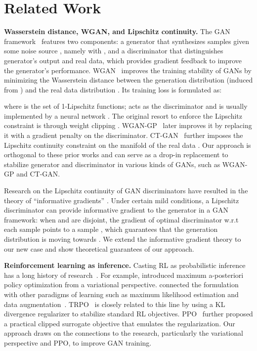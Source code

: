 \documentclass{article}
\newcommand{\0}{\bm{0}}
\begin{document}
\section{Related Work}\label{sec:related}


\textbf{Wasserstein distance, WGAN, and Lipschitz continuity.} 
The GAN framework~\cite{goodfellow2014generative} features two components: a generator  that synthesizes samples  given some noise source , namely  with , and a discriminator that distinguishes generator’s output and real data, which provides gradient feedback to improve the generator's performance. WGAN~\cite{WGAN} improves the training stability of GANs by minimizing the Wasserstein distance  between the generation distribution  (induced from ) and the real data distribution .
Its training loss is formulated as:

where  is the set of 1-Lipschitz functions;  acts as the discriminator and is usually implemented by a neural network .
The original resort to enforce the Lipschitz constraint is through weight clipping \cite{WGAN}. WGAN-GP~\cite{wgangp} later improves it by  replacing it with a gradient penalty on the discriminator. CT-GAN~\cite{wwgan} further imposes the Lipschitz continuity constraint on  the manifold of the real data . Our approach is orthogonal to these prior works and can serve as a drop-in replacement to stabilize generator and discriminator in various kinds of GANs, such as WGAN-GP and CT-GAN.






Research on the Lipschitz continuity of GAN discriminators have resulted in the theory of ``informative gradients'' \cite{lipschitz,zhou2018understanding}. Under certain mild conditions, a Lipschitz discriminator can provide informative gradient to the generator in a GAN framework: when  and  are disjoint, the gradient  of optimal discriminator  w.r.t each sample  points to a sample , which guarantees that the generation distribution  is moving towards . We extend the informative gradient theory to our new case and show theoretical guarantees of our approach.




\textbf{Reinforcement learning as inference.} 
Casting RL as probabilistic inference has a long history of research~\cite{dayan1997using,deisenroth2013survey,rawlik2013stochastic,levine2018reinforcement,abdolmaleki2018maximum}. 
For example, \citet{abdolmaleki2018maximum} introduced maximum a-posteriori policy optimization from a variational perspective. \citet{tan2018connecting} connected the formulation with other paradigms of learning such as maximum likelihood estimation and data augmentation~\citep{hu2019learning}. 
TRPO~\cite{TRPO} is closely related to this line by using a KL divergence regularizer to stabilize standard RL objectives. PPO~\cite{PPO} further proposed a practical clipped surrogate objective that emulates the regularization. Our approach draws on the connections to the research, particularly the variational perspective and PPO, to improve GAN training.
\end{document}
